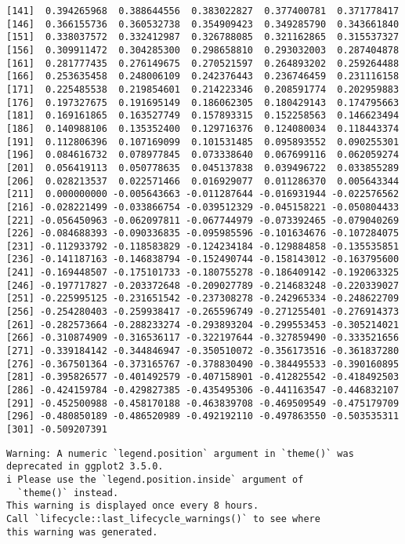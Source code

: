 \documentclass[
  10pt,
  a4paper,oneside]{article}
\begin{document}
\begin{verbatim}
[141]  0.394265968  0.388644556  0.383022827  0.377400781  0.371778417
[146]  0.366155736  0.360532738  0.354909423  0.349285790  0.343661840
[151]  0.338037572  0.332412987  0.326788085  0.321162865  0.315537327
[156]  0.309911472  0.304285300  0.298658810  0.293032003  0.287404878
[161]  0.281777435  0.276149675  0.270521597  0.264893202  0.259264488
[166]  0.253635458  0.248006109  0.242376443  0.236746459  0.231116158
[171]  0.225485538  0.219854601  0.214223346  0.208591774  0.202959883
[176]  0.197327675  0.191695149  0.186062305  0.180429143  0.174795663
[181]  0.169161865  0.163527749  0.157893315  0.152258563  0.146623494
[186]  0.140988106  0.135352400  0.129716376  0.124080034  0.118443374
[191]  0.112806396  0.107169099  0.101531485  0.095893552  0.090255301
[196]  0.084616732  0.078977845  0.073338640  0.067699116  0.062059274
[201]  0.056419113  0.050778635  0.045137838  0.039496722  0.033855289
[206]  0.028213537  0.022571466  0.016929077  0.011286370  0.005643344
[211]  0.000000000 -0.005643663 -0.011287644 -0.016931944 -0.022576562
[216] -0.028221499 -0.033866754 -0.039512329 -0.045158221 -0.050804433
[221] -0.056450963 -0.062097811 -0.067744979 -0.073392465 -0.079040269
[226] -0.084688393 -0.090336835 -0.095985596 -0.101634676 -0.107284075
[231] -0.112933792 -0.118583829 -0.124234184 -0.129884858 -0.135535851
[236] -0.141187163 -0.146838794 -0.152490744 -0.158143012 -0.163795600
[241] -0.169448507 -0.175101733 -0.180755278 -0.186409142 -0.192063325
[246] -0.197717827 -0.203372648 -0.209027789 -0.214683248 -0.220339027
[251] -0.225995125 -0.231651542 -0.237308278 -0.242965334 -0.248622709
[256] -0.254280403 -0.259938417 -0.265596749 -0.271255401 -0.276914373
[261] -0.282573664 -0.288233274 -0.293893204 -0.299553453 -0.305214021
[266] -0.310874909 -0.316536117 -0.322197644 -0.327859490 -0.333521656
[271] -0.339184142 -0.344846947 -0.350510072 -0.356173516 -0.361837280
[276] -0.367501364 -0.373165767 -0.378830490 -0.384495533 -0.390160895
[281] -0.395826577 -0.401492579 -0.407158901 -0.412825542 -0.418492503
[286] -0.424159784 -0.429827385 -0.435495306 -0.441163547 -0.446832107
[291] -0.452500988 -0.458170188 -0.463839708 -0.469509549 -0.475179709
[296] -0.480850189 -0.486520989 -0.492192110 -0.497863550 -0.503535311
[301] -0.509207391
\end{verbatim}

\begin{verbatim}
Warning: A numeric `legend.position` argument in `theme()` was
deprecated in ggplot2 3.5.0.
i Please use the `legend.position.inside` argument of
  `theme()` instead.
This warning is displayed once every 8 hours.
Call `lifecycle::last_lifecycle_warnings()` to see where
this warning was generated.
\end{verbatim}
\end{document}
